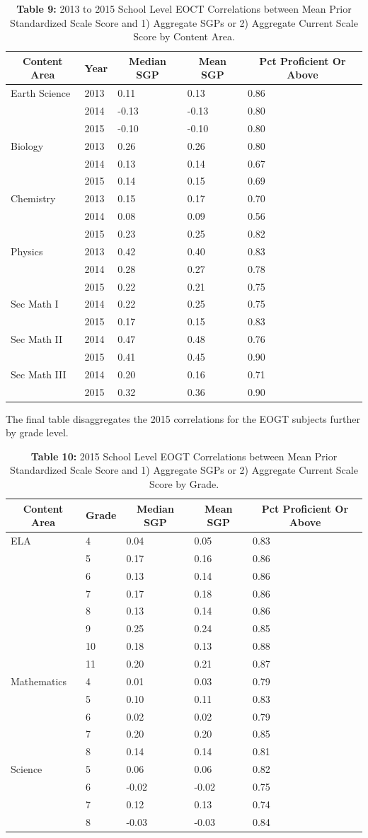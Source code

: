 \documentclass[12pt]{article}
\begin{document}
\begin{table}[H]
\caption*{\textbf{Table 9:} 2013 to 2015 School Level EOCT Correlations between Mean Prior Standardized Scale Score and 1) Aggregate SGPs or 2) Aggregate Current Scale Score by Content Area.\label{table9}} 
\begin{center}
\begin{tabular}{lllll}
\hline\hline
\multicolumn{1}{c}{Content Area}&\multicolumn{1}{c}{Year}&\multicolumn{1}{c}{Median SGP}&\multicolumn{1}{c}{Mean SGP}&\multicolumn{1}{c}{Pct Proficient Or Above}\tabularnewline
\hline
Earth Science&2013& 0.11& 0.13&0.86\tabularnewline
&2014&-0.13&-0.13&0.80\tabularnewline
&2015&-0.10&-0.10&0.80\tabularnewline
Biology&2013& 0.26& 0.26&0.80\tabularnewline
&2014& 0.13& 0.14&0.67\tabularnewline
&2015& 0.14& 0.15&0.69\tabularnewline
Chemistry&2013& 0.15& 0.17&0.70\tabularnewline
&2014& 0.08& 0.09&0.56\tabularnewline
&2015& 0.23& 0.25&0.82\tabularnewline
Physics&2013& 0.42& 0.40&0.83\tabularnewline
&2014& 0.28& 0.27&0.78\tabularnewline
&2015& 0.22& 0.21&0.75\tabularnewline
Sec Math I&2014& 0.22& 0.25&0.75\tabularnewline
&2015& 0.17& 0.15&0.83\tabularnewline
Sec Math II&2014& 0.47& 0.48&0.76\tabularnewline
&2015& 0.41& 0.45&0.90\tabularnewline
Sec Math III&2014& 0.20& 0.16&0.71\tabularnewline
&2015& 0.32& 0.36&0.90\tabularnewline
\hline
\end{tabular}\end{center}

\end{table}

The final table disaggregates the 2015 correlations for the EOGT
subjects further by grade level.

\begin{table}[H]
\caption*{\textbf{Table 10:} 2015 School Level EOGT Correlations between Mean Prior Standardized Scale Score and 1) Aggregate SGPs or 2) Aggregate Current Scale Score by Grade.\label{table10}} 
\begin{center}
\begin{tabular}{lllll}
\hline\hline
\multicolumn{1}{c}{Content Area}&\multicolumn{1}{c}{Grade}&\multicolumn{1}{c}{Median SGP}&\multicolumn{1}{c}{Mean SGP}&\multicolumn{1}{c}{Pct Proficient Or Above}\tabularnewline
\hline
ELA& 4& 0.04& 0.05&0.83\tabularnewline
& 5& 0.17& 0.16&0.86\tabularnewline
& 6& 0.13& 0.14&0.86\tabularnewline
& 7& 0.17& 0.18&0.86\tabularnewline
& 8& 0.13& 0.14&0.86\tabularnewline
& 9& 0.25& 0.24&0.85\tabularnewline
&10& 0.18& 0.13&0.88\tabularnewline
&11& 0.20& 0.21&0.87\tabularnewline
Mathematics& 4& 0.01& 0.03&0.79\tabularnewline
& 5& 0.10& 0.11&0.83\tabularnewline
& 6& 0.02& 0.02&0.79\tabularnewline
& 7& 0.20& 0.20&0.85\tabularnewline
& 8& 0.14& 0.14&0.81\tabularnewline
Science& 5& 0.06& 0.06&0.82\tabularnewline
& 6&-0.02&-0.02&0.75\tabularnewline
& 7& 0.12& 0.13&0.74\tabularnewline
& 8&-0.03&-0.03&0.84\tabularnewline
\hline
\end{tabular}\end{center}

\end{table}
\end{document}
